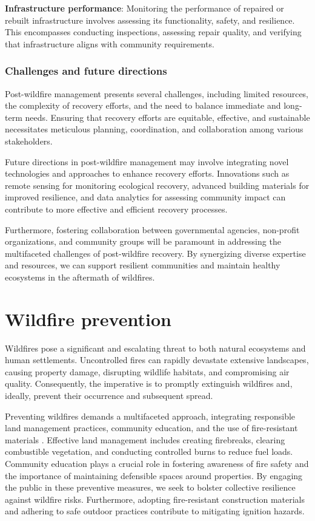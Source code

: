 \documentclass[
  12 pt,
]{Nemilov}
\begin{document}
\textbf{Infrastructure performance}: Monitoring the performance of repaired or rebuilt infrastructure involves assessing its functionality, safety, and resilience. This encompasses conducting inspections, assessing repair quality, and verifying that infrastructure aligns with community requirements.

\subsection{Challenges and future directions}\label{challenges-and-future-directions-2}

Post-wildfire management presents several challenges, including limited resources, the complexity of recovery efforts, and the need to balance immediate and long-term needs. Ensuring that recovery efforts are equitable, effective, and sustainable necessitates meticulous planning, coordination, and collaboration among various stakeholders.

Future directions in post-wildfire management may involve integrating novel technologies and approaches to enhance recovery efforts. Innovations such as remote sensing for monitoring ecological recovery, advanced building materials for improved resilience, and data analytics for assessing community impact can contribute to more effective and efficient recovery processes.

Furthermore, fostering collaboration between governmental agencies, non-profit organizations, and community groups will be paramount in addressing the multifaceted challenges of post-wildfire recovery. By synergizing diverse expertise and resources, we can support resilient communities and maintain healthy ecosystems in the aftermath of wildfires.

\chapter{Wildfire prevention}\label{wildfire-prevention}

Wildfires pose a significant and escalating threat to both natural ecosystems and human settlements. Uncontrolled fires can rapidly devastate extensive landscapes, causing property damage, disrupting wildlife habitats, and compromising air quality. Consequently, the imperative is to promptly extinguish wildfires and, ideally, prevent their occurrence and subsequent spread.

Preventing wildfires demands a multifaceted approach, integrating responsible land management practices, community education, and the use of fire-resistant materials \citep{hesseln2018wildland}. Effective land management includes creating firebreaks, clearing combustible vegetation, and conducting controlled burns to reduce fuel loads. Community education plays a crucial role in fostering awareness of fire safety and the importance of maintaining defensible spaces around properties. By engaging the public in these preventive measures, we seek to bolster collective resilience against wildfire risks. Furthermore, adopting fire-resistant construction materials and adhering to safe outdoor practices contribute to mitigating ignition hazards.
\end{document}
